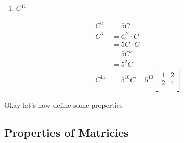 \documentclass[../../Main.tex]{subfiles}
\begin{document}
\begin{example}
\begin{enumerate}
{            \begin{align*}
            C^2 = CC
            =
            \left[
                \begin{array}{cc}
                    \rowcolor{yellow} 1 & 2 \\
                    2 & 4 \\
                \end{array}
            \right]
            \left[
                \begin{array}{>{\columncolor{green}}c c}
                    1 & 2 \\
                    2 & 4 \\
                \end{array}
            \right]
            &=
            \left[
                \begin{array}{cc}
                    5 & 10 \\
                    10 & 20 \\
                \end{array}
            \right] \\
            &= 5C
            \end{align*}
        }

        \item
        {
            $C^{11}$

            \begin{align*}
                C^2 &= 5C \\
                C^3 &= C^2 \cdot C \\
                &= 5C \cdot C \\
                &= 5C^2 \\
                &= 5^2 C \\
                C^{11} &= 5^{10} C = 5^{10} 
                \left[
                    \begin{array}{cc}
                        1 & 2 \\
                        2 & 4 \\
                    \end{array}
                \right]
            \end{align*}
        }
    \end{enumerate}
\end{example}

Okay let's now define some properties

\subsection{Properties of Matricies}
\end{document}
